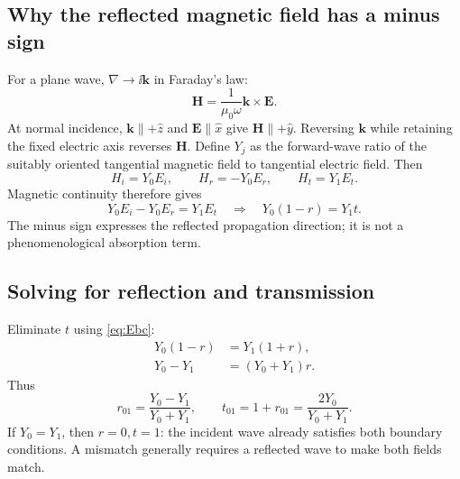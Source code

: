 \subsection{Why the reflected magnetic field has a minus sign}
For a plane wave, $\nabla\to\ii\mathbf k$ in Faraday's law:
\begin{equation}
\boxed{\mathbf H=\frac{1}{\mu_0\omega}\mathbf k\times\mathbf E.}
\label{eq:kcrossE}
\end{equation}
At normal incidence, $\mathbf k\parallel+\widehat z$ and $\mathbf E\parallel\widehat x$ give $\mathbf H\parallel+\widehat y$. Reversing $\mathbf k$ while retaining the fixed electric axis reverses $\mathbf H$. Define $Y_j$ as the forward-wave ratio of the suitably oriented tangential magnetic field to tangential electric field. Then
\begin{equation}
H_i=Y_0E_i,\qquad H_r=-Y_0E_r,\qquad H_t=Y_1E_t.
\end{equation}
Magnetic continuity therefore gives
\begin{equation}
Y_0E_i-Y_0E_r=Y_1E_t
\quad\Longrightarrow\quad\boxed{Y_0(1-r)=Y_1t.}
\label{eq:Hbc}
\end{equation}
The minus sign expresses the reflected propagation direction; it is not a phenomenological absorption term.

\subsection{Solving for reflection and transmission}
Eliminate $t$ using \eqref{eq:Ebc}:
\begin{align}
Y_0(1-r)&=Y_1(1+r),\\
Y_0-Y_1&=(Y_0+Y_1)r.
\end{align}
Thus
\begin{equation}
\boxed{r_{01}=\frac{Y_0-Y_1}{Y_0+Y_1},\qquad
 t_{01}=1+r_{01}=\frac{2Y_0}{Y_0+Y_1}.}
\label{eq:rt}
\end{equation}
If $Y_0=Y_1$, then $r=0,t=1$: the incident wave already satisfies both boundary conditions. A mismatch generally requires a reflected wave to make both fields match.

